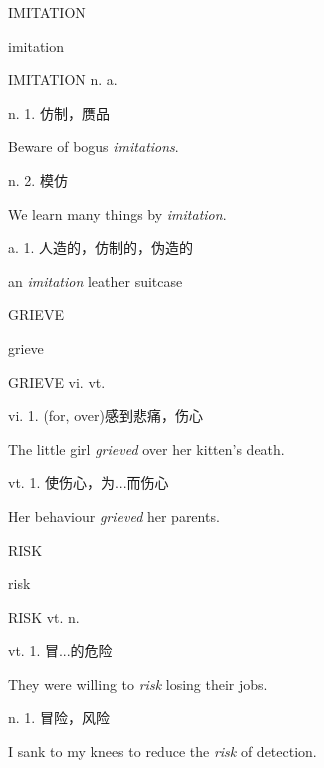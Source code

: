 \begin{flashcard}{
IMITATION

imitation
}
\begin{center}
IMITATION n. a. 
\end{center}
n. 1. 仿制，赝品

Beware of bogus \textit{imitations}.

n. 2. 模仿

We learn many things by \textit{imitation}.

a. 1. 人造的，仿制的，伪造的

an \textit{imitation} leather suitcase

\end{flashcard}
\begin{flashcard}{
GRIEVE

grieve
}
\begin{center}
GRIEVE vi. vt. 
\end{center}
vi. 1. (for, over)感到悲痛，伤心

The little girl \textit{grieved} over her kitten's death.

vt. 1. 使伤心，为...而伤心

Her behaviour \textit{grieved} her parents.

\end{flashcard}
\begin{flashcard}{
RISK

risk
}
\begin{center}
RISK vt. n. \textipa{[risk]}
\end{center}
vt. 1. 冒...的危险

They were willing to \textit{risk} losing their jobs.

n. 1. 冒险，风险

I sank to my knees to reduce the \textit{risk} of detection.

\end{flashcard}
